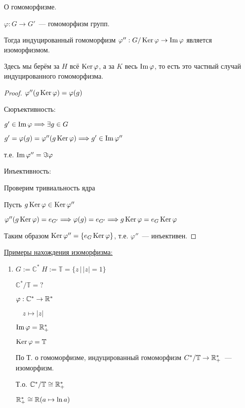 \begin{theorem}
    О гомоморфизме.

    $\varphi: G \to G'$~--- гомоморфизм групп.
    
    Тогда индуцированный гомоморфизм
    $\varphi'': G / \operatorname{Ker} \varphi \to \operatorname{Im} \varphi$
    является изоморфизмом.
    
    Здесь мы берём за $H$ всё $\operatorname{Ker} \varphi$, а за $K$ весь $\operatorname{Im} \varphi$,
    то есть это частный случай индуцированного гомоморфизма.

    \begin{proof}
        $\varphi''(g\operatorname{Ker} \varphi) = \varphi(g)$

        Сюръективность:

        $g' \in \operatorname{Im} \varphi \Longrightarrow \exists g \in G$

        $g' = \varphi(g) = \varphi''(g \operatorname{Ker} \varphi) \Longrightarrow g' \in \operatorname{Im} \varphi''$

        т.е. $\operatorname{Im} \varphi'' = \Im \varphi $

        Инъективность:

        Проверим тривиальность ядра

        Пусть $g \operatorname{Ker} \varphi \in \operatorname{Ker} \varphi''$

        $\varphi''(g  \operatorname{Ker} \varphi ) = e_{G'} \Longrightarrow \varphi(g) = e_{G'} \Longrightarrow g \operatorname{Ker} \varphi = e_{G} \operatorname{Ker} \varphi$

        Таким образом $\operatorname{Ker} \varphi'' = \{ e_{G} \operatorname{Ker} \varphi \}$, т.е. $\varphi''$~--- инъективен.
        
    \end{proof}
\end{theorem}

\underline{Примеры нахождения изоморфизма:}
\begin{enumerate}
    \item $G := \mathbb{C}^* \; H := \mathbb{T} = \{ z \, | \, |z| = 1 \}$
    
    $\mathbb{C}^* / \mathbb{T} = ?$ 

    $\varphi: \mathbb{C}^* \to \mathbb{R}^{*}$

    $\quad z \mapsto |z|$

    $\operatorname{Im} \varphi = \mathbb{R}^{*}_{+}$

    $\operatorname{Ker} \varphi = \mathbb{T}$

    По Т. о гомоморфизме, индуцированный гомоморфизм $C^{*} / \mathbb{T} \to \mathbb{R}^{*}_{+}$~--- изоморфизм.

    Т.о. $\mathbb{C}^{*} / \mathbb{T} \cong \mathbb{R}^{*}_+$

    \notice $\mathbb{R}^{*}_+ \cong \mathbb{R} (a \mapsto \ln{a})$

\end{enumerate}